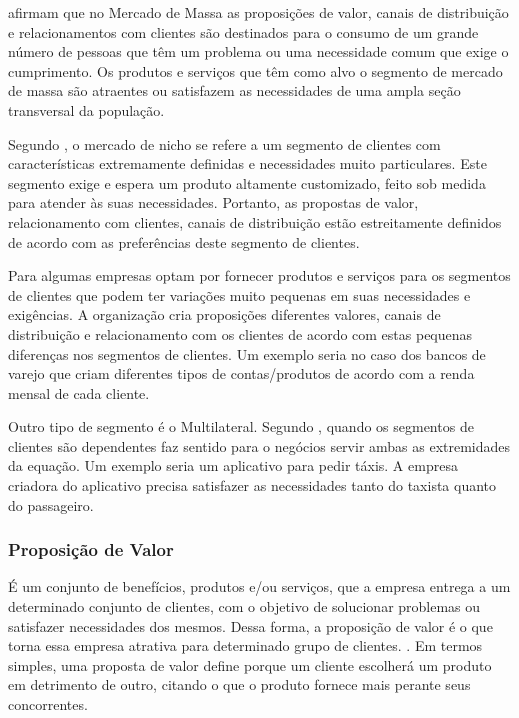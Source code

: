  afirmam que no Mercado de Massa as proposições de valor, canais de distribuição e relacionamentos com clientes são destinados para o consumo de um grande número de pessoas que têm um problema ou uma necessidade comum que exige o cumprimento. Os produtos e serviços que têm como alvo o segmento de mercado de massa são atraentes ou satisfazem as necessidades de uma ampla seção transversal da população.

Segundo , o mercado de nicho se refere a um segmento de clientes com características extremamente definidas e necessidades muito particulares. Este segmento exige e espera um produto altamente customizado, feito sob medida para atender às suas necessidades. Portanto, as propostas de valor, relacionamento com clientes, canais de distribuição estão estreitamente definidos de acordo com as preferências deste segmento de clientes.

Para  algumas empresas optam por fornecer produtos e serviços para os segmentos de clientes que podem ter variações muito pequenas em suas necessidades e exigências. A organização cria proposições diferentes valores, canais de distribuição e relacionamento com os clientes de acordo com estas pequenas diferenças nos segmentos de clientes. Um exemplo seria no caso dos bancos de varejo que criam diferentes tipos de contas/produtos de acordo com a renda mensal de cada cliente.

Outro tipo de segmento é o Multilateral. Segundo , quando os segmentos de clientes são dependentes faz sentido para o negócios servir ambas as extremidades da equação. Um exemplo seria um aplicativo para pedir táxis. A empresa criadora do aplicativo precisa satisfazer as necessidades tanto do taxista quanto do passageiro.

\subsubsection{Proposição de Valor}
\label{cha:proposicao_de_valor}
É um conjunto de benefícios, produtos e/ou serviços, que a empresa entrega a um determinado conjunto de clientes, com o objetivo de solucionar problemas ou satisfazer necessidades dos
mesmos. Dessa forma, a proposição de valor é o que torna essa empresa atrativa para
determinado grupo de clientes. \cite{businessmodel}. Em termos simples, uma proposta de valor define porque um cliente escolherá um produto em detrimento de outro, citando o que o produto fornece mais perante seus concorrentes.

